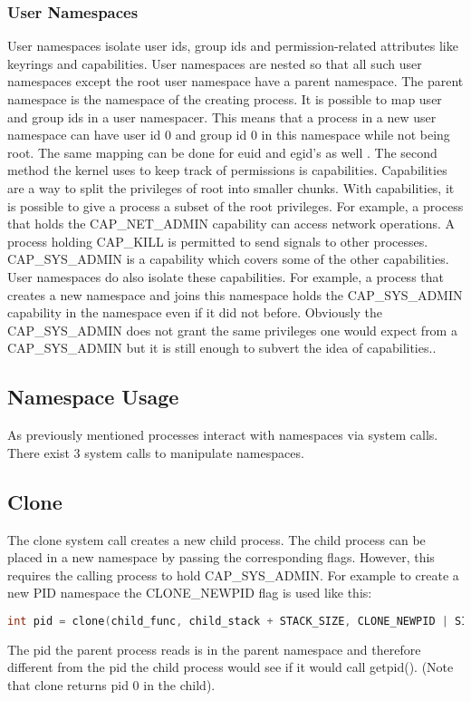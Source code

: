 \documentclass[10pt,twocolumn,a4paper]{article}
\begin{document}
\subsubsection{User Namespaces}
User namespaces isolate user ids, group ids and permission-related attributes like keyrings and
capabilities. User namespaces are nested so that all such user namespaces except the root user namespace
have a parent namespace. The parent namespace is the namespace of the creating process. 
It is possible to map user and group ids in a user namespacer. This means that a process in a new user
namespace can have user id 0 and group id 0 in this namespace while not being root. The same mapping
can be done for euid and egid's as well \cite{18}. The second method the kernel uses to keep track
of permissions is capabilities. Capabilities are a way to split the privileges of root into smaller
chunks. With capabilities, it is possible to give a process a subset of the root
privileges. For example, a process that holds the CAP\_NET\_ADMIN capability can access network
operations. A process holding CAP\_KILL is permitted to send signals to other
processes\cite{19}. CAP\_SYS\_ADMIN is a capability which covers some of the other capabilities. 
User namespaces do also isolate these capabilities. For example, a process that creates a new
namespace and joins this namespace holds the CAP\_SYS\_ADMIN capability in the namespace even if it did not before. 
Obviously the CAP\_SYS\_ADMIN does not grant the same privileges one would expect from
a CAP\_SYS\_ADMIN but it is still enough to subvert the idea of capabilities.\cite{20}. 

\subsection{Namespace Usage}
As previously mentioned processes interact with namespaces via system calls. There exist 3 system calls
to manipulate namespaces. 
\subsection{ Clone}
The clone system call creates a new child process. The child process can be placed in a new
namespace by passing the corresponding flags. However, this requires the calling process to hold
CAP\_SYS\_ADMIN. For example to create a new PID namespace the CLONE\_NEWPID flag is used like this:
\begin{lstlisting}[language=C]
    int pid = clone(child_func, child_stack + STACK_SIZE, CLONE_NEWPID | SIGCHLD, NULL);
\end{lstlisting}
The pid the parent process reads is in the parent namespace and therefore different from the pid the
child process would see if it would call getpid(). (Note that clone returns pid 0 in the
child)\cite{22}.
\end{document}
